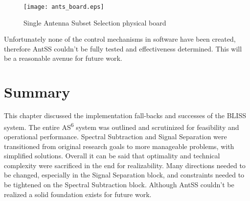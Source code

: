 \begin{figure}[!ht]\label{antss_boards}
\centering
\texttt{[image: ants\_board.eps]}
\caption{Single Antenna Subset Selection physical board}
\end{figure}

Unfortunately none of the control mechanisms in software have been created, therefore AntSS couldn't be fully tested and effectiveness determined.  This will be a reasonable avenue for future work.\\

\section{Summary}

This chapter discussed the implementation fall-backs and successes of the BLISS system.  The entire AS\textsuperscript{6} system was outlined and scrutinized for feasibility and operational performance.  Spectral Subtraction and Signal Separation were transitioned from original research goals to more manageable problems, with simplified solutions.  Overall it can be said that optimality and technical complexity were sacrificed in the end for realizability.  Many directions needed to be changed, especially in the Signal Separation block, and constraints needed to be tightened on the Spectral Subtraction block.  Although AntSS couldn't be realized a solid foundation exists for future work.\\ 




